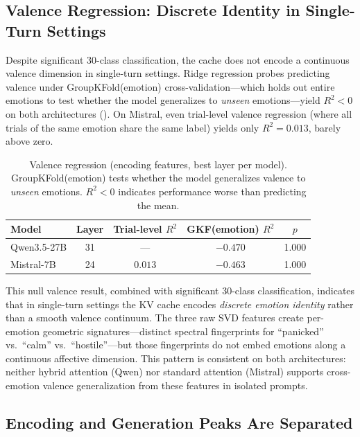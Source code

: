 \documentclass[11pt,a4paper]{article}
\begin{document}
\subsection{Valence Regression: Discrete Identity in Single-Turn Settings}

Despite significant 30-class classification, the cache does not encode a continuous valence dimension in single-turn settings. Ridge regression probes predicting valence under GroupKFold(emotion) cross-validation---which holds out entire emotions to test whether the model generalizes to \emph{unseen} emotions---yield $R^2 < 0$ on both architectures (). On Mistral, even trial-level valence regression (where all trials of the same emotion share the same label) yields only $R^2 = 0.013$, barely above zero.

\begin{table}[H]
\centering
\caption{Valence regression (encoding features, best layer per model). GroupKFold(emotion) tests whether the model generalizes valence to \emph{unseen} emotions. $R^2 < 0$ indicates performance worse than predicting the mean.}
\label{tab:regression}
\begin{tabular}{lcccc}
\toprule
\textbf{Model} & \textbf{Layer} & \textbf{Trial-level $R^2$} & \textbf{GKF(emotion) $R^2$} & \textbf{$p$} \\
\midrule
Qwen3.5-27B & 31 & --- & $-0.470$ & 1.000 \\
Mistral-7B & 24 & $0.013$ & $-0.463$ & 1.000 \\
\bottomrule
\end{tabular}
\end{table}

This null valence result, combined with significant 30-class classification, indicates that in single-turn settings the KV cache encodes \emph{discrete emotion identity} rather than a smooth valence continuum. The three raw SVD features create per-emotion geometric signatures---distinct spectral fingerprints for ``panicked'' vs.\ ``calm'' vs.\ ``hostile''---but those fingerprints do not embed emotions along a continuous affective dimension. This pattern is consistent on both architectures: neither hybrid attention (Qwen) nor standard attention (Mistral) supports cross-emotion valence generalization from these features in isolated prompts.

\subsection{Encoding and Generation Peaks Are Separated}
\label{sec:separation}
\end{document}
